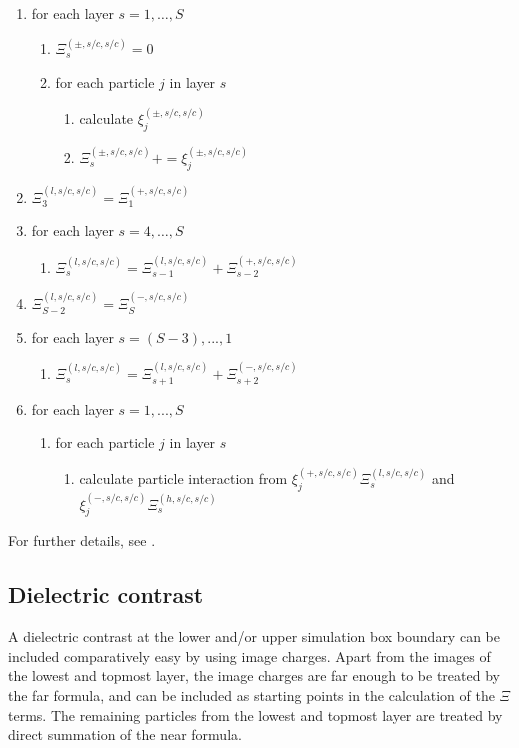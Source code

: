 \begin{enumerate}
\item for each layer $s=1,\ldots,S$ 
  \begin{enumerate}
  \item $\Xi^{(\pm,s/c,s/c)}_s=0$
  \item for each particle $j$ in layer $s$
    \begin{enumerate}
    \item calculate $\xi^{(\pm,s/c,s/c)}_j$
    \item $\Xi^{(\pm,s/c,s/c)}_s += \xi^{(\pm,s/c,s/c)}_j$
    \end{enumerate}
  \end{enumerate}
\item $\Xi^{(l,s/c,s/c)}_3=\Xi^{(+,s/c,s/c)}_1$
\item for each layer $s=4,\ldots,S$
  \begin{enumerate}
  \item $\Xi^{(l,s/c,s/c)}_s=\Xi^{(l,s/c,s/c)}_{s-1} +
    \Xi^{(+,s/c,s/c)}_{s-2}$
  \end{enumerate}
\item $\Xi^{(l,s/c,s/c)}_{S-2}=\Xi^{(-,s/c,s/c)}_S$
\item for each layer $s=(S-3),...,1$ 
  \begin{enumerate}
  \item $\Xi^{(l,s/c,s/c)}_s=\Xi^{(l,s/c,s/c)}_{s+1} +
    \Xi^{(-,s/c,s/c)}_{s+2}$
  \end{enumerate}
\item for each layer $s=1,...,S$
  \begin{enumerate}
  \item for each particle $j$ in layer $s$ 
    \begin{enumerate}
    \item calculate particle interaction from
      $\xi^{(+,s/c,s/c)}_j\Xi^{(l,s/c,s/c)}_s$ and
      $\xi^{(-,s/c,s/c)}_j\Xi^{(h,s/c,s/c)}_s$
    \end{enumerate}
  \end{enumerate}
\end{enumerate}

For further details, see
\citet{arnold02a,arnold02b,arnold02c,arnold02d}.

\subsection{Dielectric contrast}

A dielectric contrast at the lower and/or upper simulation box
boundary can be included comparatively easy by using image charges.
Apart from the images of the lowest and topmost layer, the image
charges are far enough to be treated by the far formula, and can be
included as starting points in the calculation of the $\Xi$ terms. The
remaining particles from the lowest and topmost layer are treated by
direct summation of the near formula.

